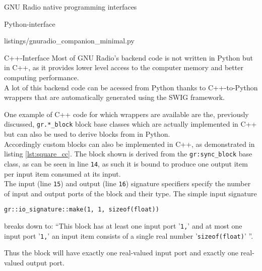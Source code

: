 \begin{subchapter}{GNU Radio native programming interfaces}
\begin{subsubchapter}{Python-interface}
    
                    {listings/gnuradio_companion_minimal.py}

  \end{subsubchapter}

  \begin{subsubchapter}{C++-Interface}
    Most of GNU Radio's backend code is not written in Python
    but in C++, as it provides lower level access to the computer
    memory and better computing performance. \\

    A lot of this backend code can be acessed from Python
    thanks to C++-to-Python wrappers that are automatically
    generated using the SWIG \cite{swigweb} framework.

    One example of C++ code for which wrappers are available
    are the, previously discussed, \texttt{gr.*\_block} block
    base classes which are actually implemented in C++
    but can also be used to derive blocks from in Python. \\

    Accordingly custom blocks can also be implemented in
    C++, as demonstrated in listing \ref{lst:square_cc}.
    The block shown is derived from the \texttt{gr:sync\_block}
    base class, as can be seen in line \texttt{14}, as
    such it is bound to produce one output item
    per input item consumed at its input. \\

    The input (line \texttt{15}) and output (line \texttt{16})
    signature specifiers specify the number of input and output
    ports of the block and their type.
    The simple input signature

    \begin{center}
      \texttt{gr::io\_signature::make(1, 1, sizeof(float))}
    \end{center}

    breaks down to: ``This block has at least one input port '\texttt{1,}' and
    at most one input port '\texttt{1,}' an input item consists of a single real
    number '\texttt{sizeof(float)}' ''.

    Thus the block will have exactly one real-valued input port and exactly
    one real-valued output port. \\


\end{subsubchapter}
\end{subchapter}
